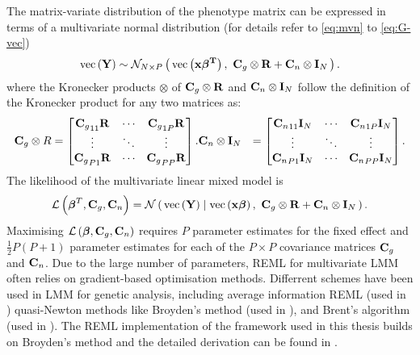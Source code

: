 % 
The matrix-variate distribution of the phenotype matrix  can be expressed in terms of a multivariate normal distribution (for details refer to \cref{eq:mvn} to \cref{eq:G-vec})
%
\begin{equation}
\text{vec}\left(\boldsymbol{\mathbf{Y}}\right) \sim \mathcal{N}_{N\times P}\left(\, {\text{vec}\left(\boldsymbol{\mathbf{x}}\boldsymbol{\mathbf{\beta^T}}\right)} \,,~{\boldsymbol{\mathbf{C}}_g \otimes \boldsymbol{\mathbf{R}} + \boldsymbol{\mathbf{C}}_n \otimes\boldsymbol{\mathbf{I}}_N} \,\right).
\label{eq:lmm-mv-multin}
\end{equation}
%
where the Kronecker products \(\otimes\) of \(\boldsymbol{\mathbf{C}}_g \otimes \boldsymbol{\mathbf{R}}\) and \(\boldsymbol{\mathbf{C}}_n \otimes\boldsymbol{\mathbf{I}}_N\)  follow the definition of the Kronecker product for any two matrices as:
\begin{align*}
 \boldsymbol{\mathbf{C}}_g \otimes R &=
  \begin{bmatrix}
  {\boldsymbol{\mathbf{C}}_g}_{11}\boldsymbol{\mathbf{R}}  &  \cdots &  {\boldsymbol{\mathbf{C}}_g}_{1P}\boldsymbol{\mathbf{R}}  \\
   \vdots &  \ddots & \vdots \\
  {\boldsymbol{\mathbf{C}}_g}_{P1}\boldsymbol{\mathbf{R}}  &  \cdots &  {\boldsymbol{\mathbf{C}}_g}_{PP}\boldsymbol{\mathbf{R}}  \\
   \end{bmatrix}.
    \boldsymbol{\mathbf{C}}_n \otimes  \boldsymbol{\mathbf{I}}_N&=
  \begin{bmatrix}
  {\boldsymbol{\mathbf{C}}_n}_{11}\boldsymbol{\mathbf{I}}_N &  \cdots &  {\boldsymbol{\mathbf{C}}_n}_{1P}\boldsymbol{\mathbf{I}}_N  \\
   \vdots &  \ddots & \vdots \\
  {\boldsymbol{\mathbf{C}}_n}_{P1}\boldsymbol{\mathbf{I}}_N  &  \cdots &  {\boldsymbol{\mathbf{C}}_n}_{PP}\boldsymbol{\mathbf{I}}_N  \\
   \end{bmatrix}.
\end{align*}
%
The likelihood of the multivariate linear mixed model is
%
\begin{equation}
\mathcal{L}\left(\boldsymbol{\mathbf{\beta}}^T, \boldsymbol{\mathbf{C}}_g, \boldsymbol{\mathbf{C}}_n\right) = \mathcal{N}\left(\,{\text{vec}\left(\boldsymbol{\mathbf{Y}}\right) \mid \text{vec}\left(\boldsymbol{\mathbf{x}}\boldsymbol{\mathbf{\beta}}\right)}\,,~{\boldsymbol{\mathbf{C}}_g \otimes\boldsymbol{\mathbf{R}} + \boldsymbol{\mathbf{C}}_n \otimes\boldsymbol{\mathbf{I}}_N}\,\right).
\label{eq:lmm-mv-likelihood}
\end{equation}
%
Maximising \(\mathcal{L}\left(\boldsymbol{\mathbf{\beta}}, \boldsymbol{\mathbf{C}}_g, \boldsymbol{\mathbf{C}}_n\right)\) requires \(P\) parameter estimates for the fixed effect \tmat{\beta} and \(\frac{1}{2}P \left( P + 1\right)\) parameter estimates for each of the \(P \times P\) covariance matrices \(\boldsymbol{\mathbf{C}}_g\) and  \(\boldsymbol{\mathbf{C}}_n\). Due to the large number of parameters, REML for multivariate LMM often relies on gradient-based optimisation methods. Differrent schemes have been used in LMM for genetic analysis, including average information REML \citep{Gilmour1995} (used in \citep{Yang2011}) quasi-Newton methods like Broyden's method \citep{Broyden1965} (used in \citep{Casale2015}), and Brent's algorithm \citep{Brent1971} (used in \citep{Lippert2011,Svishcheva2012}). The REML implementation of the framework used in this thesis builds on Broyden's method and the detailed derivation can be found in \citep[Supplementary material]{Casale2015}.


